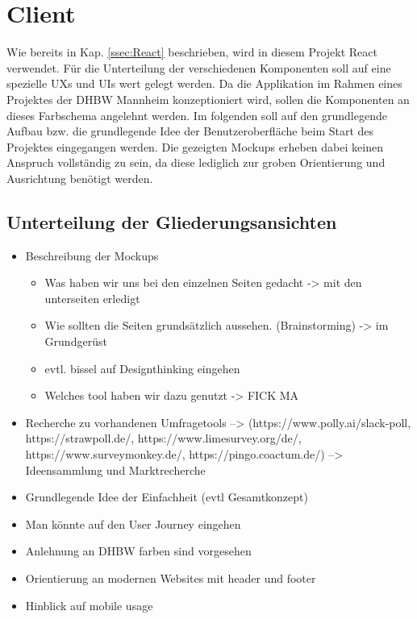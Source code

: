 \section{Client}
\label{sec:ClientKonzept}

Wie bereits in Kap. \vref{ssec:React} beschrieben, wird in diesem Projekt React verwendet. 
Für die Unterteilung der verschiedenen Komponenten soll auf eine spezielle \acfp{UX} und \acfp{UI} wert gelegt werden. 
Da die Applikation im Rahmen eines Projektes der DHBW Mannheim konzeptioniert wird, sollen die Komponenten an dieses Farbschema angelehnt werden. 
Im folgenden soll auf den grundlegende Aufbau bzw. die grundlegende Idee der Benutzeroberfläche beim Start des Projektes eingegangen werden. 
Die gezeigten Mockups erheben dabei keinen Anspruch vollständig zu sein, da diese lediglich zur groben Orientierung und Ausrichtung benötigt werden.













\subsection{Unterteilung der Gliederungsansichten}

\begin{itemize}
	\item Beschreibung der Mockups 
	 \begin{itemize}
		 \item Was haben wir uns bei den einzelnen Seiten gedacht -> mit den unterseiten erledigt
		 \item Wie sollten die Seiten grundsätzlich aussehen. (Brainstorming) -> im Grundgerüst
		 \item evtl. bissel auf Designthinking eingehen 
		 \item Welches tool haben wir dazu genutzt ->  FICK MA
	 \end{itemize}
	 \item Recherche zu vorhandenen Umfragetools --> (https://www.polly.ai/slack-poll, https://strawpoll.de/, https://www.limesurvey.org/de/, https://www.surveymonkey.de/, https://pingo.coactum.de/)
	 --> Ideensammlung und Marktrecherche
	 \item Grundlegende Idee der Einfachheit (evtl Gesamtkonzept)
	 \item Man könnte auf den User Journey eingehen
	 \item Anlehnung an DHBW farben sind vorgesehen
	 \item Orientierung an modernen Websites mit header und footer
	 \item Hinblick auf mobile usage
\end{itemize}

